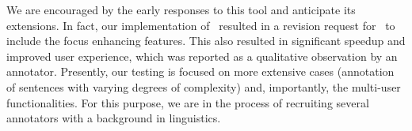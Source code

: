 We are encouraged by the early responses to this tool and anticipate its extensions.
In fact, our implementation of \boatvtwo\ resulted in a revision request for \boatvone\ to include the focus enhancing features.
This also resulted in significant speedup and improved user experience, which was reported as a qualitative observation by an annotator.
Presently, our testing is focused on more extensive cases (annotation of sentences with varying degrees of complexity) and, importantly, the multi-user functionalities.
For this purpose, we are in the process of recruiting several annotators with a background in linguistics.

